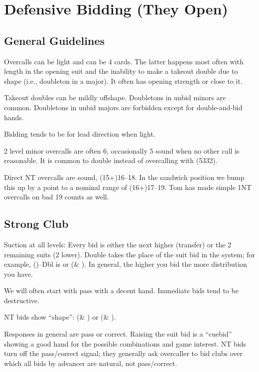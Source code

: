\documentclass[tom-ari]{subfile}
\begin{document}
	
	\chapter{Defensive Bidding (They Open)}
	
	\section{General Guidelines}
	
	Overcalls can be light and can be 4 cards. The latter happens most often with length in the opening suit and the inability to make a takeout double due to shape (i.e., doubleton in a major). It often has opening strength or close to it.
	
	Takeout doubles can be mildly offshape. Doubletons in unbid minors are common. Doubletons in unbid majors are forbidden except for double-and-bid hands.
	
	Bidding tends to be for lead direction when light.
	
	2 level minor overcalls are often 6, occasionally 5 sound when no other call is reasonable. It is common to double instead of overcalling with \shape(5332).
	
	Direct NT overcalls are sound, (15+)16--18. In the sandwich position we bump this up by a point to a nominal range of (16+)17--19. Tom has made simple 1NT overcalls on bad 19 counts as well.
	
	\section{Strong Club}
	
	Suction at all levels: Every bid is either the next higher (transfer) or the 2 remaining suits (2 lower). Double takes the place of the suit bid in the system; for example, ()--Dbl is \diamondsuit or (\heartsuit \& \spadesuit). In general, the higher you bid the more distribution you have. 
	
	We will often start with pass with a decent hand. Immediate bids tend to be destructive.
	
	NT bids show ``shape'': (\diamondsuit \& \spadesuit) or (\clubsuit \& \heartsuit).
	
	Responses in general are pass or correct. Raising the suit bid is a ``cuebid'' showing a good hand for the possible combinations and game interest. NT bids turn off the pass/correct signal; they generally ask overcaller to bid clubs over which all bids by advancer are natural, not pass/correct.
	
\end{document}
